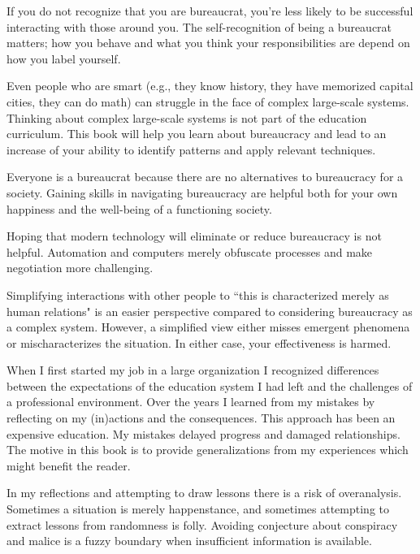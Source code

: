 If you do not recognize that you are bureaucrat, you're less likely to be successful interacting with those around you. The self-recognition of being a bureaucrat matters; how you behave and what you think your responsibilities are depend on how you label yourself.

Even people who are smart (e.g., they know history, they have memorized capital cities, they can do math) can struggle in the face of complex large-scale systems. Thinking about complex large-scale systems is not part of the education curriculum. This book will help you learn about bureaucracy and lead to an increase of your ability to identify patterns and apply relevant techniques.

Everyone is a bureaucrat because there are no alternatives to bureaucracy for a society. Gaining skills in navigating bureaucracy are helpful both for your own happiness and the well-being of a functioning society. 

Hoping that modern technology will eliminate or reduce bureaucracy is not helpful. Automation and computers merely obfuscate processes and make negotiation more challenging. 

Simplifying interactions with other people to ``this is characterized merely as human relations" is an easier perspective compared to considering bureaucracy as a complex system. 
However, a simplified view either misses emergent phenomena or mischaracterizes the situation. In either case, your effectiveness is harmed.



 When I first started my job in a large organization I recognized differences between the expectations of the education system I had left and the challenges of a professional environment. Over the years I learned from my mistakes by reflecting on my (in)actions and the consequences. This approach has been an expensive education. My mistakes delayed progress and damaged relationships. The motive in this book is to provide generalizations from my experiences which might benefit the reader.



In my reflections and attempting to draw lessons there is a risk of overanalysis. Sometimes a situation is merely happenstance, and sometimes attempting to extract lessons from randomness is folly. Avoiding conjecture about conspiracy and malice is a fuzzy boundary when insufficient information is available. 

